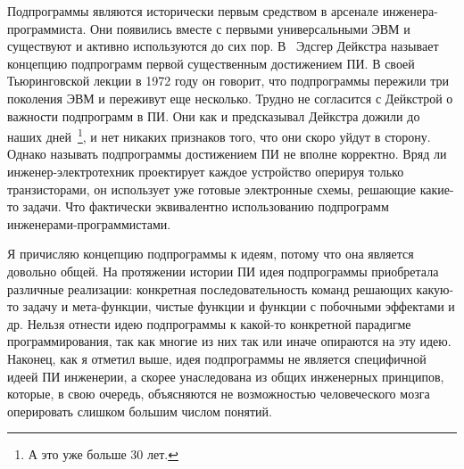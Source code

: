 Подпрограммы являются исторически первым средством в арсенале инженера-программиста. Они появились вместе с первыми универсальными ЭВМ и существуют и активно используются до сих пор. В~\cite{Dijkstra:1972:HP} Эдсгер Дейкстра называет концепцию подпрограмм первой существенным достижением ПИ. В своей Тьюринговской лекции в 1972 году он говорит, что подпрограммы пережили три поколения ЭВМ и переживут еще несколько. Трудно не согласится с Дейкстрой о важности подпрограмм в ПИ. Они как и предсказывал Дейкстра дожили до наших дней~\footnote{А это уже больше 30 лет.}, и нет никаких признаков того, что они скоро уйдут в сторону. Однако называть подпрограммы достижением ПИ не вполне корректно. Вряд ли инженер-электротехник проектирует каждое устройство оперируя только транзисторами, он использует уже готовые электронные схемы, решающие какие-то задачи. Что фактически эквивалентно использованию подпрограмм инженерами-программистами.

Я причисляю концепцию подпрограммы к идеям, потому что она является довольно общей. На протяжении истории ПИ идея подпрограммы приобретала различные реализации: конкретная последовательность команд решающих какую-то задачу и мета-функции, чистые функции и функции с побочными эффектами и др. Нельзя отнести идею подпрограммы к какой-то конкретной парадигме программирования, так как многие из них так или иначе опираются на эту идею. Наконец, как я отметил выше, идея подпрограммы не является специфичной идеей ПИ инженерии, а скорее унаследована из общих инженерных принципов, которые, в свою очередь, объясняются не возможностью человеческого мозга оперировать слишком большим числом понятий.
